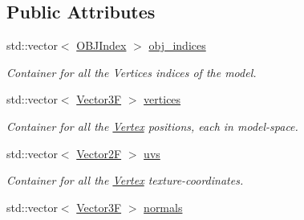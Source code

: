 \subsection*{Public Attributes}
\begin{DoxyCompactItemize}
\item 
\mbox{\label{classtz_1_1graphics_1_1model_1_1_o_b_j_model_a0f2904907849a9ca1162a60e17d5deb9}} 
std\+::vector$<$ \mbox{\hyperlink{classtz_1_1graphics_1_1model_1_1_o_b_j_index}{O\+B\+J\+Index}} $>$ \mbox{\hyperlink{classtz_1_1graphics_1_1model_1_1_o_b_j_model_a0f2904907849a9ca1162a60e17d5deb9}{obj\+\_\+indices}}
\begin{DoxyCompactList}\small\item\em Container for all the Vertices\textquotesingle{} indices of the model. \end{DoxyCompactList}\item 
\mbox{\label{classtz_1_1graphics_1_1model_1_1_o_b_j_model_aec5e5251ce3c0014eea3a39efe4054ea}} 
std\+::vector$<$ \mbox{\hyperlink{class_vector3}{Vector3F}} $>$ \mbox{\hyperlink{classtz_1_1graphics_1_1model_1_1_o_b_j_model_aec5e5251ce3c0014eea3a39efe4054ea}{vertices}}
\begin{DoxyCompactList}\small\item\em Container for all the \mbox{\hyperlink{class_vertex}{Vertex}} positions, each in model-\/space. \end{DoxyCompactList}\item 
\mbox{\label{classtz_1_1graphics_1_1model_1_1_o_b_j_model_a2c07f0f503215dae74a6e7178680d997}} 
std\+::vector$<$ \mbox{\hyperlink{class_vector2}{Vector2F}} $>$ \mbox{\hyperlink{classtz_1_1graphics_1_1model_1_1_o_b_j_model_a2c07f0f503215dae74a6e7178680d997}{uvs}}
\begin{DoxyCompactList}\small\item\em Container for all the \mbox{\hyperlink{class_vertex}{Vertex}} texture-\/coordinates. \end{DoxyCompactList}\item 
\mbox{\label{classtz_1_1graphics_1_1model_1_1_o_b_j_model_abf68bdb8296b2a8298e591bfbf0075da}} 
std\+::vector$<$ \mbox{\hyperlink{class_vector3}{Vector3F}} $>$ \mbox{\hyperlink{classtz_1_1graphics_1_1model_1_1_o_b_j_model_abf68bdb8296b2a8298e591bfbf0075da}{normals}}

\end{DoxyCompactItemize}
